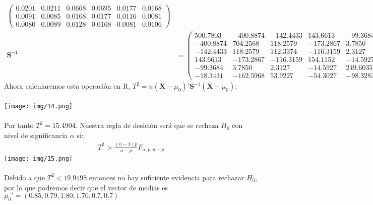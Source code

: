 \begin{sol}
\begin{itemize}
\begin{align*}
\begin{pmatrix}
        0.0201 & 0.0211 & 0.0668 & 0.0695 & 0.0177 & 0.0168 \\
        0.0091 & 0.0085 & 0.0168 & 0.0177 & 0.0116 & 0.0081 \\
        0.0080 & 0.0089 & 0.0128 & 0.0168 & 0.0081 & 0.0106
    \end{pmatrix} \\
    \mathbf{S^{-1}} &= \begin{pmatrix}
        500.7803 & -400.8874 & -142.4433 & 143.6613 & -99.3684 & -18.3431 \\
        -400.8874 & 704.2568 & 118.2579 & -173.2867 & 3.7850 & -162.5968 \\
        -142.4433 & 118.2579 & 112.3374 & -116.3159 & 2.3127 & 53.9227 \\
        143.6613 & -173.2867 & -116.3159 & 154.1152 & -14.5927 & -54.3027 \\
        -99.3684 & 3.7850 & 2.3127 & -14.5927 & 249.6035 & -98.3283 \\
        -18.3431 & -162.5968 & 53.9227 & -54.3027 & -98.3283 & 340.3370
    \end{pmatrix}
\end{align*}
Ahora calcularemos esta operación en R, $T^2=n(\bar{\mathbf{X}} - \mu_0)'\mathbf{S}^{-1}(\mathbf{\bar{X}}-\mu_0)$: \\\\
\texttt{[image: img/14.png]}\\\\
Por tanto $T^2 = 15.4904$. Nuestra regla de desición será que se rechaza $H_0$ con nivel de significancia $\alpha$ si:
\begin{align*}
T^2 > \frac{(n-1)p}{n-p}F_{\alpha,p,n-p}
\end{align*}
\texttt{[image: img/15.png]}\\\\
Debido a que $T^2<19.9198$ entonces no hay suficiente evidencia para rechazar $H_0$, por lo que podremos decir que el vector de medias es  $\mu_0'=(0.85,0.79,1.80,1.70,0.7,0.7)$ \pagebreak


\end{itemize}
\end{sol}
